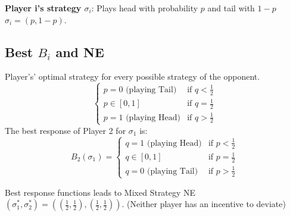 \documentclass[../Main.tex]{subfiles}
\begin{document}
\textbf{Player i's strategy $\sigma_i$}: Plays head with probability \textit{$p$} and tail with \textit{$1-p$} $\sigma_i = (p, 1-p)$.

\subsection*{Best $B_i$ and NE}
Player's' optimal strategy for every possible strategy of the opponent.
\[
\begin{cases} 
    p = 0 \text{ (playing Tail)} & \text{if } q < \frac{1}{2} \\
    p \in [0, 1] & \text{if } q = \frac{1}{2} \\
    p = 1 \text{ (playing Head)} & \text{if } q > \frac{1}{2}
\end{cases}
\]
The best response of Player 2 for $\sigma_1$ is:
\[
B_2(\sigma_1) = 
\begin{cases} 
    q = 1 \text{ (playing Head)} & \text{if } p < \frac{1}{2} \\
    q \in [0, 1] & \text{if } p = \frac{1}{2} \\
    q = 0 \text{ (playing Tail)} & \text{if } p > \frac{1}{2}
\end{cases}
\]

Best response functions leads to Mixed Strategy NE $(\sigma_1^*, \sigma_2^*) = ((\frac{1}{2}, \frac{1}{2}), (\frac{1}{2}, \frac{1}{2}))$. (Neither player has an incentive to deviate)
\end{document}
